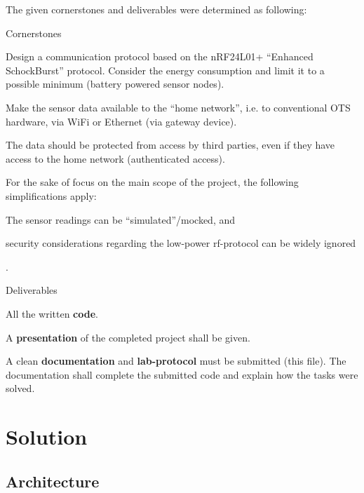 The given cornerstones and deliverables were determined as following:

\begin{sumbox}{Cornerstones}
\begin{compactitem}
  \item Design a communication protocol based on the nRF24L01+ ``Enhanced SchockBurst'' protocol. Consider the energy consumption and limit it to a possible minimum (battery powered sensor nodes).
  \item Make the sensor data available to the ``home network'', i.e. to conventional OTS hardware, via WiFi or Ethernet (via gateway device).
  \item The data should be protected from access by third parties, even if they have access to the home network (authenticated access).
\end{compactitem}
\end{sumbox}

For the sake of focus on the main scope of the project, the following simplifications apply:
\begin{enumerate*}[label=(\alph*)]
  \item The sensor readings can be ``simulated''/mocked, and
  \item security considerations regarding the low-power \gls{rf}-protocol can be widely ignored
\end{enumerate*}.

\begin{sumbox}{Deliverables}
\begin{compactitem}
  \item All the written \textbf{code}.
  \item A \textbf{presentation} of the completed project shall be given.
  \item A clean \textbf{documentation} and \textbf{lab-protocol} must be submitted (this file). The documentation shall complete the submitted code and explain how the tasks were solved.
\end{compactitem}
\end{sumbox}


\section{Solution}

\subsection{Architecture}

